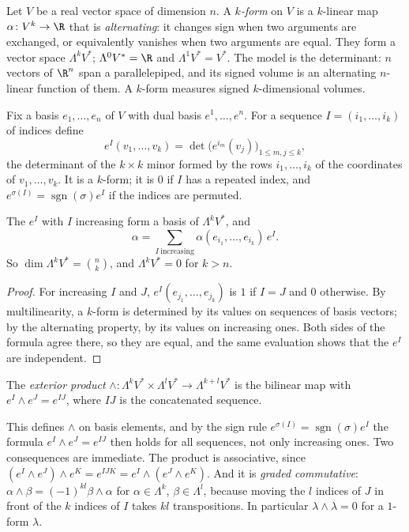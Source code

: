 Let $V$ be a real vector space of dimension $n$. A \emph{$k$-form} on $V$ is a $k$-linear map $\alpha\colon V^k\to\R$ that is \emph{alternating}: it changes sign
when two arguments are exchanged, or equivalently vanishes when two arguments are equal. They form a vector space $\Lambda^kV^*$; $\Lambda^0V^*=\R$ and
$\Lambda^1V^*=V^*$. The model is the determinant: $n$ vectors of $\R^n$ span a parallelepiped, and its signed volume is an alternating $n$-linear function of
them. A $k$-form measures signed $k$-dimensional volumes.

Fix a basis $e_1,\dots,e_n$ of $V$ with dual basis $e^1,\dots,e^n$. For a sequence $I=(i_1,\dots,i_k)$ of indices define
\[
e^I(v_1,\dots,v_k)=\det\bigl(e^{i_m}(v_j)\bigr)_{1\le m,j\le k},
\]
the determinant of the $k\times k$ minor formed by the rows $i_1,\dots,i_k$ of the coordinates of $v_1,\dots,v_k$. It is a $k$-form; it is $0$ if $I$ has a repeated
index, and $e^{\sigma(I)}=\operatorname{sgn}(\sigma)e^I$ if the indices are permuted.

\begin{proposition}\label{prop:altbasis}
The $e^I$ with $I$ increasing form a basis of $\Lambda^kV^*$, and
\[
\alpha=\sum_{I\ \mathrm{increasing}}\alpha(e_{i_1},\dots,e_{i_k})\,e^I.
\] So $\dim\Lambda^kV^*=\binom nk$, and
$\Lambda^kV^*=0$ for $k>n$.
\end{proposition}
\begin{proof}
For increasing $I$ and $J$, $e^I(e_{j_1},\dots,e_{j_k})$ is $1$ if $I=J$ and $0$ otherwise. By multilinearity, a $k$-form is determined by its values on
sequences of basis vectors; by the alternating property, by its values on increasing ones. Both sides of the formula agree there, so they are equal, and the
same evaluation shows that the $e^I$ are independent.
\end{proof}

\begin{definition}
The \emph{exterior product} $\wedge\colon\Lambda^kV^*\times\Lambda^lV^*\to\Lambda^{k+l}V^*$ is the bilinear map with $e^I\wedge e^J=e^{IJ}$, where $IJ$ is the concatenated
sequence.
\end{definition}

This defines $\wedge$ on basis elements, and by the sign rule $e^{\sigma(I)}=\operatorname{sgn}(\sigma)e^I$ the formula $e^I\wedge e^J=e^{IJ}$ then holds for all sequences, not only
increasing ones. Two consequences are immediate. The product is associative, since $(e^I\wedge e^J)\wedge e^K=e^{IJK}=e^I\wedge(e^J\wedge e^K)$. And it is
\emph{graded commutative}: $\alpha\wedge\beta=(-1)^{kl}\beta\wedge\alpha$ for $\alpha\in\Lambda^k$, $\beta\in\Lambda^l$, because moving the $l$ indices of $J$ in front of
the $k$ indices of $I$ takes $kl$ transpositions. In particular $\lambda\wedge\lambda=0$ for a $1$-form $\lambda$.

